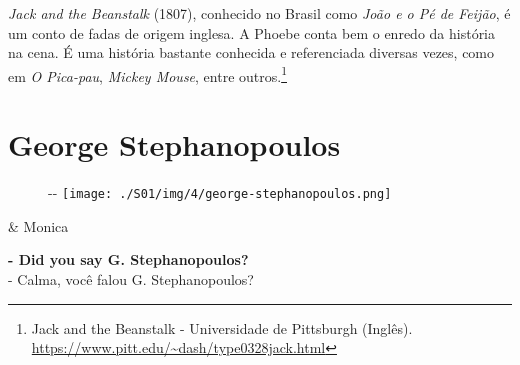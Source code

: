 \emph{Jack and the Beanstalk} (1807), conhecido no Brasil como
\emph{João e o Pé de Feijão}, é um conto de fadas de origem inglesa. A
Phoebe conta bem o enredo da história na cena. É uma história bastante
conhecida e referenciada diversas vezes, como em \emph{O Pica-pau},
\emph{Mickey Mouse}, entre outros.\footnote{\sloppy Jack and the Beanstalk - Universidade de Pittsburgh (Inglês). \url{https://www.pitt.edu/~dash/type0328jack.html}}

\hypertarget{george-stephanopoulos}{%
\section{George Stephanopoulos}\label{george-stephanopoulos}}

\begin{figure}[!ht]
  \begin{adjustwidth}{-\oddsidemargin-1in}{-\rightmargin}
    \centering
    \texttt{[image: ./S01/img/4/george-stephanopoulos.png]}
  \end{adjustwidth}
\end{figure}

\begin{tcolorbox}[enhanced,center upper,
    drop fuzzy shadow southeast, boxrule=0.3pt,
    lower separated=false, breakable,
    colframe=black!30!dialogoBorder,colback=white]
\begin{minipage}[c]{0.16\linewidth}
   & \centering \scriptsize{Monica}
\end{minipage}
\hfill
\begin{minipage}[c]{0.8\linewidth}
  \textbf{- Did you say G. Stephanopoulos?}\\
  - Calma, você falou G. Stephanopoulos?
\end{minipage}
\end{tcolorbox}


